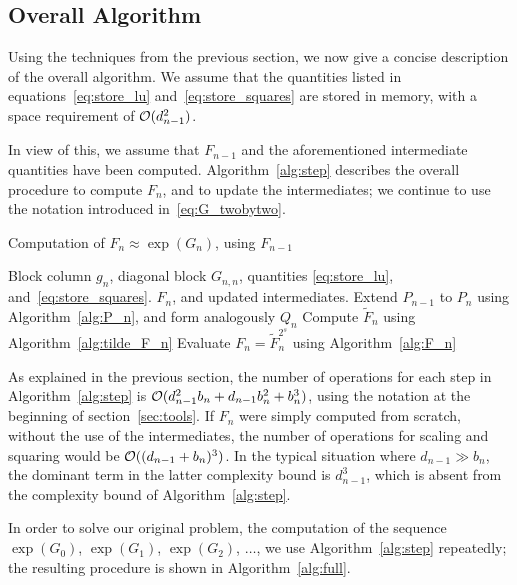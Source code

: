 \subsection{Overall Algorithm}
\label{sec:overall}

Using the techniques from the previous section, we now give a concise
description of the overall algorithm.  We assume that the quantities
listed in equations~\eqref{eq:store_lu}
and~\eqref{eq:store_squares} are stored in memory, with a space requirement of ${\mathcal O}(d_{n-1}^2)$. 

In view of this, we assume that $F_{n-1}$ and the aforementioned intermediate
quantities have been computed.  Algorithm~\ref{alg:step} describes the
overall procedure to compute $F_n$, and to update the intermediates;
we continue to use the notation introduced in~\eqref{eq:G_twobytwo}.

\begin{algorithm}[ht]
    \caption{Computation of $F_n \approx \exp(G_n)$, using $F_{n-1}$
    \label{alg:step}}
    \begin{algorithmic}[1]
        \REQUIRE Block column $g_n$, diagonal block $G_{n,n}$, quantities \eqref{eq:store_lu},
        and~\eqref{eq:store_squares}.
        \ENSURE $F_n$, and updated intermediates.
        \STATE Extend $P_{n-1}$ to $P_n$ using Algorithm~\ref{alg:P_n},
        and form analogously $Q_n$
        \STATE Compute $\tilde{F}_n$ using Algorithm~\ref{alg:tilde_F_n}
        \STATE Evaluate $F_n = \tilde{F}_n^{2^s}$
        using Algorithm~\ref{alg:F_n}
    \end{algorithmic}
\end{algorithm}

As explained in the previous section, the number of operations for
each step in Algorithm~\ref{alg:step} is ${\mathcal O}(d_{n-1}^2 b_n +
d_{n-1} b_n^2 + b_n^3)$, using the notation at the beginning of
section~\ref{sec:tools}.  If $F_n$ were simply computed from scratch, without
the use of the intermediates, the number of operations for scaling and
squaring would be ${\mathcal O}((d_{n-1} + b_n)^3)$.  In the typical
situation where $d_{n-1} \gg b_n$, the dominant term in the latter
complexity bound is $d_{n-1}^3$, which is absent from the complexity
bound of Algorithm~\ref{alg:step}.

In order to solve our original problem, the computation of the
sequence $\exp(G_0)$, $\exp(G_1)$, $\exp(G_2)$, $\dotsc$, we use
Algorithm~\ref{alg:step} repeatedly; the resulting procedure is shown
in Algorithm~\ref{alg:full}.

